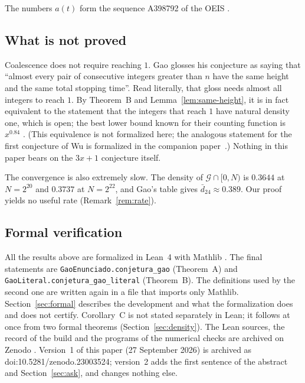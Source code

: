 \documentclass[11pt]{amsart}
\theoremstyle{definition}
\theoremstyle{remark}
\newcommand{\dbar}{\bar d}
\newcommand{\lean}[1]{\nolinkurl{#1}}
\begin{document}
The numbers $a(t)$ form the sequence A398792 of the OEIS \cite{OEIS}.

\subsection*{What is not proved}
Coalescence does not require reaching $1$. Gao glosses his conjecture as saying that ``almost every pair of consecutive integers greater than $n$ have the same height and the same total stopping time''. Read literally, that gloss needs almost all integers to reach $1$. By Theorem~B and Lemma~\ref{lem:same-height}, it is in fact equivalent to the statement that the integers that reach $1$ have natural density one, which is open; the best lower bound known for their counting function is $x^{0.84}$ \cite{KL03}. (This equivalence is not formalized here; the analogous statement for the first conjecture of Wu \cite{Wu92} is formalized in the companion paper~\cite{SaidWu}.) Nothing in this paper bears on the $3x+1$ conjecture itself.

The convergence is also extremely slow. The density of $\mathcal G\cap[0,N)$ is $0.3644$ at $N=2^{20}$ and $0.3737$ at $N=2^{22}$, and Gao's table gives $\dbar_{24}\approx0.389$. Our proof yields no useful rate (Remark~\ref{rem:rate}).

\subsection*{Formal verification}
All the results above are formalized in Lean~4 \cite{Lean4} with Mathlib \cite{Mathlib}. The final statements are \lean{GaoEnunciado.conjetura_gao} (Theorem~A) and \lean{GaoLiteral.conjetura_gao_literal} (Theorem~B). The definitions used by the second one are written again in a file that imports only Mathlib. Section~\ref{sec:formal} describes the development and what the formalization does and does not certify. Corollary~C is not stated separately in Lean; it follows at once from two formal theorems (Section~\ref{sec:density}). The Lean sources, the record of the build and the programs of the numerical checks are archived on Zenodo \cite{Artifact}. Version~1 of this paper (27 September 2026) is archived as doi:10.5281/zenodo.23003524; version~2 adds the first sentence of the abstract and Section~\ref{sec:ask}, and changes nothing else.
\end{document}

